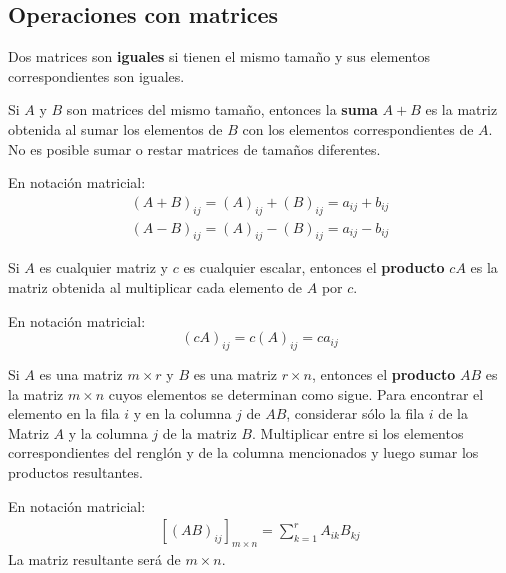 \documentclass[a4paper,12pt]{article}
\begin{document}
\subsection{Operaciones con matrices}

\begin{concept}[i]
  Dos matrices son \textbf{iguales} si tienen el mismo tamaño y sus elementos
  correspondientes son iguales.
\end{concept}

\begin{concept}[i]
  Si $A$ y $B$ son matrices del mismo tamaño, entonces la \textbf{suma}
  $A+B$ es la matriz obtenida al sumar los elementos de $B$ con los elementos
  correspondientes de $A$. No es posible sumar o restar matrices de tamaños
  diferentes.
\end{concept}
En notación matricial:
  \begin{align*}
    (A+B)_{ij} = (A)_{ij} + (B)_{ij} = a_{ij} + b_{ij} \\
    (A-B)_{ij} = (A)_{ij} - (B)_{ij} = a_{ij} - b_{ij}
  \end{align*}

\begin{concept}[i]
  Si $A$ es cualquier matriz y $c$ es cualquier escalar, entonces el
  \textbf{producto} $cA$ es la matriz obtenida al multiplicar cada elemento de
  $A$ por $c$.
\end{concept}
En notación matricial:
\begin{equation*}
  (cA)_{ij} = c(A)_{ij} = ca_{ij}
\end{equation*}

\begin{concept}
  Si $A$ es una matriz $m\times r$ y $B$ es una matriz $r\times n$, entonces
  el \textbf{producto} $AB$ es la matriz $m\times n$ cuyos elementos se
  determinan como sigue. Para encontrar el elemento en la fila $i$ y en la
  columna $j$ de $AB$, considerar sólo la fila $i$ de la Matriz $A$ y la
  columna $j$ de la matriz $B$. Multiplicar entre si los elementos
  correspondientes del renglón y de la columna mencionados y luego sumar los
  productos resultantes.
\end{concept}
En notación matricial:
\begin{align*}
  \left[ (AB)_{ij} \right]_{m\times n} = \sum_{k=1}^r A_{ik}B_{kj}
\end{align*}
La matriz resultante será de $m\times n$.

\end{document}
